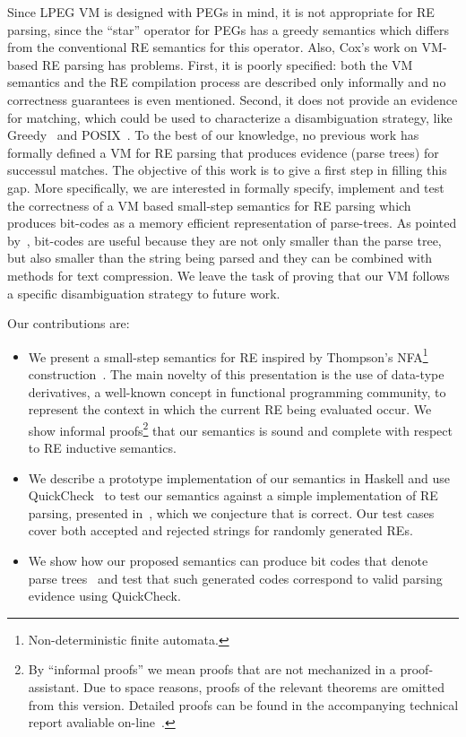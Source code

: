 \documentclass[sigplan]{acmart}
\theoremstyle{definition}
\begin{document}
Since LPEG VM is designed with PEGs in mind, it is not appropriate for RE parsing, since the ``star''
operator for PEGs has a greedy semantics which differs from the conventional RE semantics for this operator. Also, Cox's work
on VM-based RE parsing has problems. First, it is poorly specified: both the VM semantics and the RE
compilation process are described only informally and no correctness guarantees is even mentioned. Second,
it does not provide an evidence for matching, which could be used to characterize a disambiguation strategy, like
Greedy~\cite{Frisch2004} and POSIX~\cite{Sulzmann14}. To the best of our knowledge, no previous work
has formally defined a VM for RE parsing that produces evidence (parse trees) for successul matches.
The objective of this work is to give a first step in filling this gap. More specifically, we are interested in formally
specify, implement and test the correctness of a VM based small-step semantics for RE parsing which produces bit-codes as
a memory efficient representation of parse-trees. As pointed by~\cite{Lasse2011}, bit-codes are useful because they
are not only smaller than the parse tree, but also smaller than the string being parsed and they can be combined with methods
for text compression. We leave the task of proving that our VM follows a specific disambiguation
strategy to future work.

Our contributions are:

\begin{itemize}
  \item We present a small-step semantics for RE inspired by  Thompson's NFA\footnote{Non-deterministic finite automata.}
        construction~\cite{Thompson1968}. The main novelty of this presentation is
        the use of data-type derivatives, a well-known concept in functional programming community, to represent
        the context in which the current RE being evaluated occur. We show informal proofs\footnote{By ``informal proofs'' we
        mean proofs that are not mechanized in a proof-assistant. Due to space reasons, proofs of the relevant theorems are omitted from this
        version. Detailed proofs can be found in the accompanying technical report avaliable on-line~\cite{regexvm-rep}.} that our semantics
        is sound and complete with respect to RE inductive semantics.
  \item We describe a prototype implementation of our semantics in Haskell and use QuickCheck~\cite{Claessen2000} to test our semantics
        against a simple implementation of RE parsing, presented in~\cite{Fischer2010}, which we conjecture that is correct.
        Our test cases cover both accepted and rejected strings for randomly generated REs.
  \item We show how our proposed semantics can produce bit codes that denote parse trees~\cite{Lasse2011} and test that
        such generated codes correspond to valid parsing evidence using QuickCheck.
\end{itemize}
\end{document}

